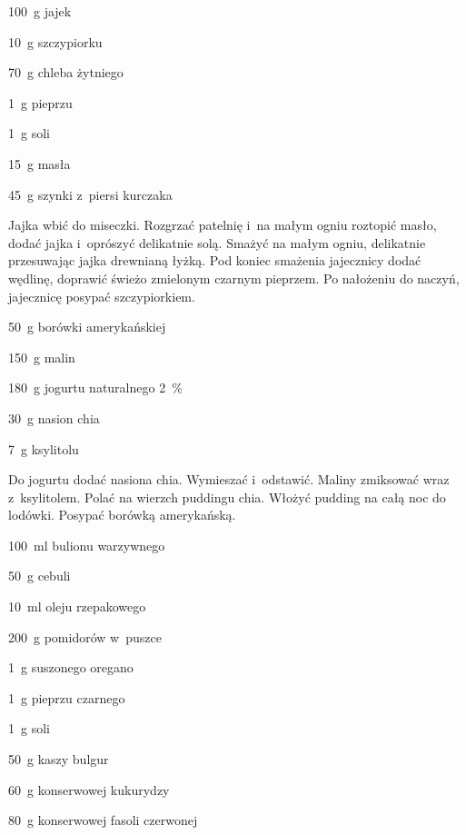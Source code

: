 \documentclass[../kucharek.tex]{subfiles}
\begin{document}
\begin{Ingred}
    \item \qty{100}{\gram} jajek
    \item \qty{10}{\gram} szczypiorku
    \item \qty{70}{\gram} chleba żytniego
    \item \qty{1}{\gram} pieprzu
    \item \qty{1}{\gram} soli
    \item \qty{15}{\gram} masła
    \item \qty{45}{\gram} szynki z~piersi kurczaka
\end{Ingred}

Jajka wbić do miseczki. Rozgrzać patelnię i~na małym ogniu roztopić masło,
dodać jajka i~oprószyć delikatnie solą. Smażyć na małym ogniu, delikatnie
przesuwając jajka drewnianą łyżką. Pod koniec smażenia jajecznicy dodać
wędlinę, doprawić świeżo zmielonym czarnym pieprzem. Po nałożeniu do naczyń,
jajecznicę posypać szczypiorkiem.


\begin{Ingred}
    \item \qty{50}{\gram} borówki amerykańskiej
    \item \qty{150}{\gram} malin
    \item \qty{180}{\gram} jogurtu naturalnego \qty{2}{\percent}
    \item \qty{30}{\gram} nasion chia
    \item \qty{7}{\gram} ksylitolu
\end{Ingred}

Do jogurtu dodać nasiona chia. Wymieszać i~odstawić. Maliny zmiksować wraz
z~ksylitolem. Polać na wierzch puddingu chia. Włożyć pudding na całą noc do
lodówki. Posypać borówką amerykańską.


\begin{Ingred}
    \item \qty{100}{\milli\litre} bulionu warzywnego
    \item \qty{50}{\gram} cebuli
    \item \qty{10}{\milli\litre} oleju rzepakowego
    \item \qty{200}{\gram} pomidorów w~puszce
    \item \qty{1}{\gram} suszonego oregano
    \item \qty{1}{\gram} pieprzu czarnego
    \item \qty{1}{\gram} soli
    \item \qty{50}{\gram} kaszy bulgur
    \item \qty{60}{\gram} konserwowej kukurydzy
    \item \qty{80}{\gram} konserwowej fasoli czerwonej
\end{Ingred}
\end{document}
